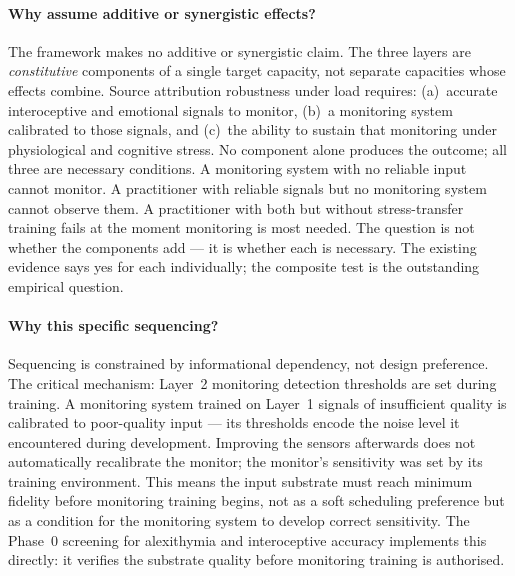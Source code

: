 \documentclass[12pt, a4paper]{article}
\begin{document}
\paragraph{Why assume additive or synergistic effects?}
The framework makes no additive or synergistic claim. The three layers are
\emph{constitutive} components of a single target capacity, not separate
capacities whose effects combine. Source attribution robustness under load
requires: (a)~accurate interoceptive and emotional signals to monitor,
(b)~a monitoring system calibrated to those signals, and (c)~the ability
to sustain that monitoring under physiological and cognitive stress. No
component alone produces the outcome; all three are necessary conditions.
A monitoring system with no reliable input cannot monitor. A practitioner
with reliable signals but no monitoring system cannot observe them. A
practitioner with both but without stress-transfer training fails at the
moment monitoring is most needed. The question is not whether the components
add --- it is whether each is necessary. The existing evidence says yes
for each individually; the composite test is the outstanding empirical question.

\paragraph{Why this specific sequencing?}
Sequencing is constrained by informational dependency, not design preference.
The critical mechanism: Layer~2 monitoring detection thresholds are set
during training. A monitoring system trained on Layer~1 signals of insufficient
quality is calibrated to poor-quality input --- its thresholds encode the noise
level it encountered during development. Improving the sensors afterwards does
not automatically recalibrate the monitor; the monitor's sensitivity was set
by its training environment. This means the input substrate must reach minimum
fidelity before monitoring training begins, not as a soft scheduling preference
but as a condition for the monitoring system to develop correct sensitivity.
The Phase~0 screening for alexithymia and interoceptive accuracy implements
this directly: it verifies the substrate quality before monitoring training
is authorised.
\end{document}
